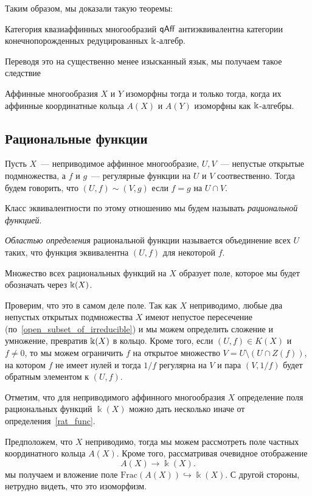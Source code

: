 	    Таким образом, мы доказали такую теоремы: 
	    \begin{theorem}\label{antieq_cat_1} 
	    	Категория квазиаффинных многообразий $\mathsf{qAff}$ антиэквивалентна категории конечнопорожденных редуцированных $\Bbbk$-алгебр.  
	    \end{theorem}

     Переводя это на существенно менее изысканный язык, мы получаем такое следствие 

     \begin{corollary}
         Аффинные многообразия $X$ и $Y$ изоморфны тогда и только тогда, когда их аффинные координатные кольца $A(X)$ и $A(Y)$  изоморфны как $\Bbbk$-алгебры. 
     \end{corollary}

	
	\subsection{Рациональные функции}


	\begin{definition}\label{rat_func}
		Пусть $X$~--- неприводимое аффинное многообразие, $U, V$~--- непустые открытые подмножества, а $f$ и $g$~--- регулярные функции на $U$ и $V$ соотвественно. Тогда будем говорить, что $(U, f) \sim (V, g)$ если $f = g$ на $U \cap V$.

		Класс эквивалентности по этому отношению мы будем называть \emph{рациональной функцией}.  

		\emph{Областью определения} рациональной функции называется объединение всех $U$ таких, что функция эквивалентна $(U, f)$ для некоторой $f$.
	\end{definition}

	\begin{remark}
		Множество всех рациональных функций на $X$ образует поле, которое мы будет обозначать через $\Bbbk(X)$. 

		Проверим, что это в самом деле поле. Так как $X$ неприводимо, любые два непустых открытых подмножества $X$ имеют непустое пересечение (по~\ref{open_subset_of_irreducible}) и мы можем определить сложение и умножение, превратив $\Bbbk(X)$ в кольцо. Кроме того, если $(U, f) \in K(X)$ и $f \neq 0$, то мы можем ограничить $f$ на открытое множество $V = U \setminus (U \cap Z(f))$, на котором $f$ не имеет нулей и тогда $1/f$ регулярна на $V$ и пара $(V, 1/f)$ будет обратным элементом к $(U, f)$. 
	\end{remark}

	Отметим, что для неприводимого аффинного многообразия $X$ определение поля рациональных функций $\Bbbk(X)$ можно дать несколько иначе от определения~\ref{rat_func}. 

	Предположем, что $X$ неприводимо, тогда мы можем рассмотреть поле частных координатного кольца $A(X)$. Кроме того, рассматривая очевидное отображение 
	\[
		A(X) \to \Bbbk(X).
	\]
	мы получаем и вложение поле $\mathrm{Frac}(A(X)) \hookrightarrow \Bbbk(X)$. С другой стороны, нетрудно видеть, что это изоморфизм. 





